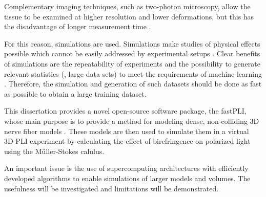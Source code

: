 Complementary imaging techniques, such as two-photon microscopy, allow the tissue to be examined at higher resolution and lower deformations, but this has the disadvantage of longer measurement time \cite{Costantini2020, Costantini2021}.
\par
% 
For this reason, simulations are used.
Simulations make studies of physical effects possible which cannot be easily addressed by experimental setups \cite{Callaghan2019, Menzel2020}.
Clear benefits of simulations are the repeatability of experiments and the possibility to generate relevant statistics (\ie{}, large data sets) to meet \eg{} the requirements of machine learning \cite{Ginsburger2018, ginsburgerDis2019}.
Therefore, the simulation and generation of such datasets should be done as fast as possible to obtain a large training dataset.
\par
%
This dissertation provides a novel open-source software package, the \ac{fastPLI}, whose main purpose is to provide a method for modeling dense, non-colliding 3D nerve fiber models \cite{Matuschke2019, Matuschke2021, Reuter2019}.
These models are then used to simulate them in a virtual \ac{3D-PLI} experiment by calculating the effect of birefringence on polarized light using the M{\"u}ller-Stokes calulus.
\par
% 
An important issue is the use of supercomputing architectures with efficiently developed algorithms to enable simulations of larger models and volumes.
The usefulness will be investigated and limitations will be demonstrated.